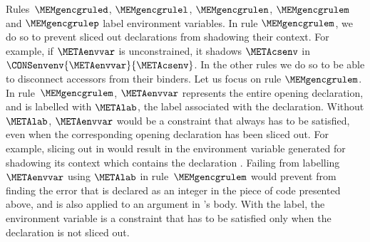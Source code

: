 \documentclass{jfp1}
\begin{document}
%
Rules~$\MEMgencgruled$, $\MEMgencgrulel$, $\MEMgencgrulen$,
$\MEMgencgrulem$ and $\MEMgencgrulep$ label environment variables.
%
In rule $\MEMgencgrulem$, we do so to prevent sliced out declarations
from shadowing their context.  For example, if $\METAenvvar$ is
unconstrained, it shadows $\METAcsenv$ in
$\CONSenvenv{\METAenvvar}{\METAcsenv}$.  In the other rules we do so
to be able to disconnect accessors from their binders.
%
%
%
%
Let us focus on rule $\MEMgencgrulem$.  In rule~$\MEMgencgrulem$,
$\METAenvvar$ represents the entire opening declaration, and
is labelled with $\METAlab$, the label associated with the declaration.
%
Without $\METAlab$, $\METAenvvar$ would be a constraint that always
has to be satisfied, even when the corresponding opening declaration
has been sliced out.
%
For example, slicing out  in
would result in the environment variable generated for
 shadowing its context which contains
the declaration .  Failing from labelling
$\METAenvvar$ using $\METAlab$ in rule~$\MEMgencgrulem$
would prevent
from finding the error that  is declared as an
integer in the piece of code presented above, and is also applied to
an argument in 's body.
%
With the label, the
environment variable is a constraint that has to be satisfied only
when the declaration is not sliced out.
%
%



\end{document}
